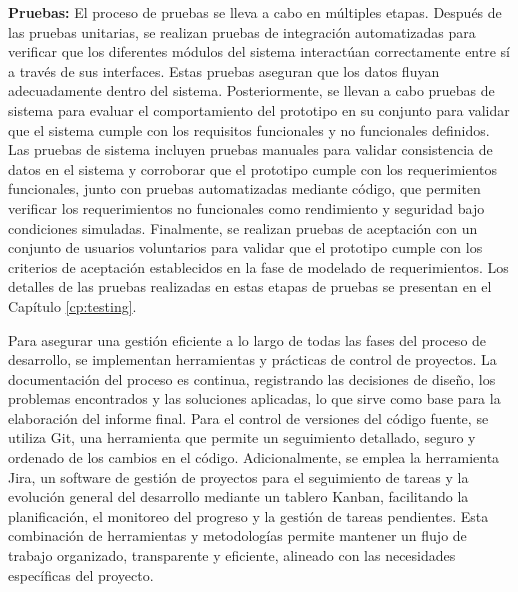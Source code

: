 \textbf{Pruebas:}
El proceso de pruebas se lleva a cabo en múltiples etapas.
Después de las pruebas unitarias, se realizan pruebas de integración automatizadas para verificar que los diferentes módulos del sistema interactúan correctamente entre sí a través de sus interfaces.
Estas pruebas aseguran que los datos fluyan adecuadamente dentro del sistema.
Posteriormente, se llevan a cabo pruebas de sistema para evaluar el comportamiento del prototipo en su conjunto para validar que el sistema cumple con los requisitos funcionales y no funcionales definidos.
Las pruebas de sistema incluyen pruebas manuales para validar consistencia de datos en el sistema y corroborar que el prototipo cumple con los requerimientos funcionales, junto con pruebas automatizadas mediante código, que permiten verificar los requerimientos no funcionales como rendimiento y seguridad bajo condiciones simuladas.
Finalmente, se realizan pruebas de aceptación con un conjunto de usuarios voluntarios para validar que el prototipo cumple con los criterios de aceptación establecidos en la fase de modelado de requerimientos.
Los detalles de las pruebas realizadas en estas etapas de pruebas se presentan en el Capítulo \ref{cp:testing}.

Para asegurar una gestión eficiente a lo largo de todas las fases del proceso de desarrollo, se implementan herramientas y prácticas de control de proyectos. La documentación del proceso es continua, registrando las decisiones de diseño, los problemas encontrados y las soluciones aplicadas, lo que sirve como base para la elaboración del informe final. Para el control de versiones del código fuente, se utiliza Git, una herramienta que permite un seguimiento detallado, seguro y ordenado de los cambios en el código. Adicionalmente, se emplea la herramienta Jira, un software de gestión de proyectos para el seguimiento de tareas y la evolución general del desarrollo mediante un tablero Kanban, facilitando la planificación, el monitoreo del progreso y la gestión de tareas pendientes. Esta combinación de herramientas y metodologías permite mantener un flujo de trabajo organizado, transparente y eficiente, alineado con las necesidades específicas del proyecto.

